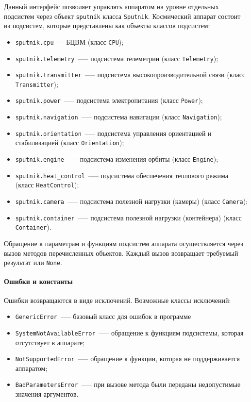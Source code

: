 \documentclass[12pt,a4paper]{article}
\begin{document}
Данный интерфейс позволяет управлять аппаратом на уровне отдельных подсистем через объект
\verb'sputnik' класса \verb'Sputnik'. Космический аппарат состоит из подсистем, которые представлены как
объекты классов подсистем:

\begin{itemize}
\item \verb'sputnik.cpu'~--- БЦВМ (класс \verb'CPU');
\item \verb'sputnik.telemetry'~--— подсистема телеметрии (класс \verb'Telemetry');
\item \verb'sputnik.transmitter'~--— подсистема высокопроизводительной связи (класс \verb'Transmitter');
\item \verb'sputnik.power'~--— подсистема электропитания (класс \verb'Power');
\item \verb'sputnik.navigation'~--— подсистема навигации (класс \verb'Navigation');
\item \verb'sputnik.orientation'~--— подсистема управления ориентацией и стабилизацией (класс \verb'Orientation');
\item \verb'sputnik.engine'~--— подсистема изменения орбиты (класс \verb'Engine');
\item \verb'sputnik.heat_control'~--— подсистема обеспечения теплового режима (класс \verb'HeatControl');
\item \verb'sputnik.camera'~--— подсистема полезной нагрузки (камеры) (класс \verb'Camera');
\item \verb'sputnik.container'~--— подсистема полезной нагрузки (контейнера) (класс \verb'Container').
\end{itemize}
  
Обращение к параметрам и функциям подсистем аппарата осуществляется через вызов методов
перечисленных объектов. Каждый вызов возвращает требуемый результат или \verb'None'.

\paragraph{Ошибки и константы}

Ошибки возвращаются в виде исключений. Возможные классы исключений:

\begin{itemize}
\item \verb'GenericError'~--— базовый класс для ошибок в программе
\item \verb'SystemNotAvailableError'~--— обращение к функциям подсистемы, которая отсутствует в аппарате;
\item \verb'NotSupportedError'~--— обращение к функции, которая не поддерживается аппаратом;
\item \verb'BadParametersError'~--— при вызове метода были переданы недопустимые значения аргументов.
\end{itemize}
\end{document}
